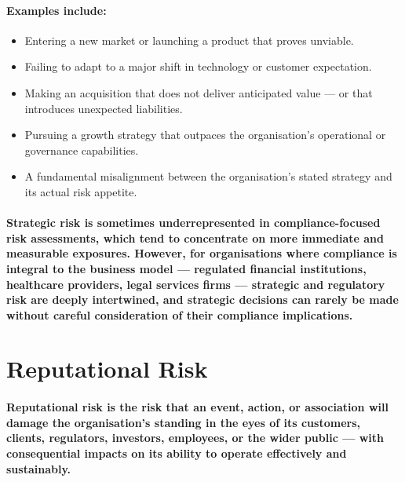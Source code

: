 \paragraph{Examples include:}
\begin{itemize}
  \item{Entering a new market or launching a product that proves unviable.}
  \item{Failing to adapt to a major shift in technology or customer expectation.}
  \item{Making an acquisition that does not deliver anticipated value — or that introduces unexpected liabilities.}
  \item{Pursuing a growth strategy that outpaces the organisation's operational or governance capabilities.}
  \item{A fundamental misalignment between the organisation's stated strategy and its actual risk appetite.}
\end{itemize}
\paragraph{Strategic risk is sometimes underrepresented in compliance-focused risk assessments, which tend to concentrate on more immediate and measurable exposures. However, for organisations where compliance is integral to the business model — regulated financial institutions, healthcare providers, legal services firms — strategic and regulatory risk are deeply intertwined, and strategic decisions can rarely be made without careful consideration of their compliance implications.}

\section{Reputational Risk}
\paragraph{Reputational risk is the risk that an event, action, or association will damage the organisation's standing in the eyes of its customers, clients, regulators, investors, employees, or the wider public — with consequential impacts on its ability to operate effectively and sustainably.}

